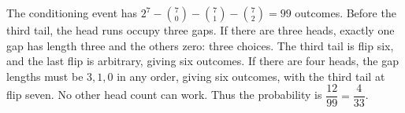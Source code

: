 The conditioning event has $2^7-\binom70-\binom71-\binom72=99$ outcomes. Before the third tail, the head runs occupy three gaps. If there are three heads, exactly one gap has length three and the others zero: three choices. The third tail is flip six, and the last flip is arbitrary, giving six outcomes. If there are four heads, the gap lengths must be $3,1,0$ in any order, giving six outcomes, with the third tail at flip seven. No other head count can work. Thus the probability is $\dfrac{12}{99}=\boxed{\dfrac{4}{33}}$.
